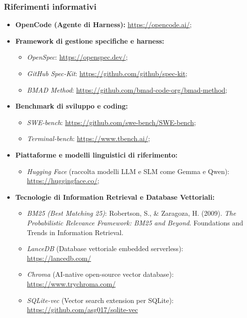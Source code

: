 \documentclass[a4paper, 11pt]{article}
\begin{document}
\subsubsection{Riferimenti informativi}
\begin{itemize}[noitemsep]
    \item \textbf{OpenCode (Agente di Harness):} \url{https://opencode.ai/};
    \item \textbf{Framework di gestione specifiche e harness:} 
        \begin{itemize}[noitemsep]
            \item \textit{OpenSpec}: \url{https://openspec.dev/};
            \item \textit{GitHub Spec-Kit}: \url{https://github.com/github/spec-kit};
            \item \textit{BMAD Method}: \url{https://github.com/bmad-code-org/bmad-method};
        \end{itemize}
    \item \textbf{Benchmark di sviluppo e coding:} 
        \begin{itemize}[noitemsep]
            \item \textit{SWE-bench}: \url{https://github.com/swe-bench/SWE-bench};
            \item \textit{Terminal-bench}: \url{https://www.tbench.ai/};
        \end{itemize}
    \item \textbf{Piattaforme e modelli linguistici di riferimento:} 
        \begin{itemize}[noitemsep]
            \item \textit{Hugging Face} (raccolta modelli LLM e SLM come Gemma e Qwen): \url{https://huggingface.co/};
        \end{itemize}
    \item \textbf{Tecnologie di Information Retrieval e Database Vettoriali:}
        \begin{itemize}[noitemsep]
            \item \textit{BM25 (Best Matching 25)}: Robertson, S., \& Zaragoza, H. (2009). \textit{The Probabilistic Relevance Framework: BM25 and Beyond}. Foundations and Trends in Information Retrieval.
            \item \textit{LanceDB} (Database vettoriale embedded serverless): \url{https://lancedb.com/}
            \item \textit{Chroma} (AI-native open-source vector database): \url{https://www.trychroma.com/}
            \item \textit{SQLite-vec} (Vector search extension per SQLite): \url{https://github.com/asg017/sqlite-vec}
        \end{itemize}
\end{itemize}
\end{document}
